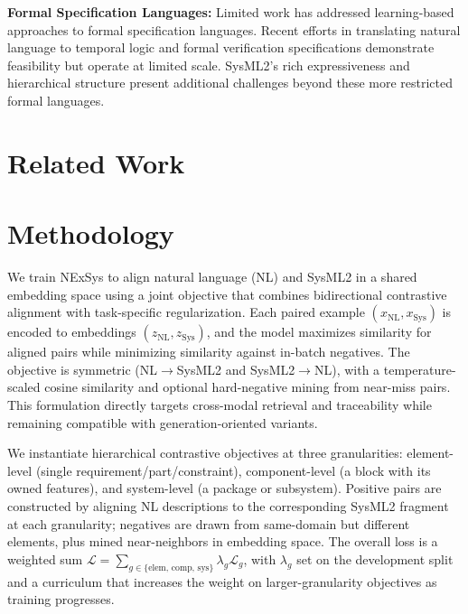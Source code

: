 \documentclass{article}
\begin{document}
\textbf{Formal Specification Languages:} Limited work has addressed learning-based approaches to formal specification languages. Recent efforts in translating natural language to temporal logic \cite{hahn2021omega} and formal verification specifications \cite{jain2022jigsaw} demonstrate feasibility but operate at limited scale. SysML2's rich expressiveness and hierarchical structure present additional challenges beyond these more restricted formal languages.

\section{Related Work}
\label{sec:related}


\section{Methodology}
\label{sec:methodology}

We train NExSys to align natural language (NL) and SysML2 in a shared embedding space using a joint objective that combines bidirectional contrastive alignment with task-specific regularization. Each paired example $(x_{\text{NL}}, x_{\text{Sys}})$ is encoded to embeddings $(z_{\text{NL}}, z_{\text{Sys}})$, and the model maximizes similarity for aligned pairs while minimizing similarity against in-batch negatives. The objective is symmetric (NL$\rightarrow$SysML2 and SysML2$\rightarrow$NL), with a temperature-scaled cosine similarity and optional hard-negative mining from near-miss pairs. This formulation directly targets cross-modal retrieval and traceability while remaining compatible with generation-oriented variants.

We instantiate hierarchical contrastive objectives at three granularities: element-level (single requirement/part/constraint), component-level (a block with its owned features), and system-level (a package or subsystem). Positive pairs are constructed by aligning NL descriptions to the corresponding SysML2 fragment at each granularity; negatives are drawn from same-domain but different elements, plus mined near-neighbors in embedding space. The overall loss is a weighted sum $\mathcal{L}=\sum_{g \in \{\text{elem, comp, sys}\}} \lambda_g \mathcal{L}_g$, with $\lambda_g$ set on the development split and a curriculum that increases the weight on larger-granularity objectives as training progresses.
\end{document}
